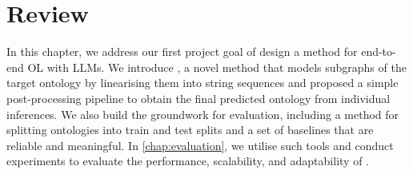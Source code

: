 \section{Review}

In this chapter, we address our first project goal of design a method for end-to-end OL with LLMs. We introduce \name, a novel method that models subgraphs of the target ontology by linearising them into string sequences and proposed a simple post-processing pipeline to obtain the final predicted ontology from individual inferences. We also build the groundwork for evaluation, including a method for splitting ontologies into train and test splits and a set of baselines that are reliable and meaningful. In \cref{chap:evaluation}, we utilise such tools and conduct experiments to evaluate the performance, scalability, and adaptability of \name.
